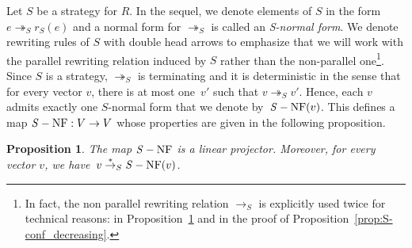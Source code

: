 \documentclass[10pt]{easychair}
\newtheorem{proposition}[theorem]{Proposition}
\theoremstyle{definition}
\newcommand\parS{\twoheadrightarrow_S}
\newcommand\transRew{\overset{*}{\to}}
\DeclareMathOperator{\SNF}{{\it S}-NF}
\begin{document}
Let $S$ be a strategy for $R$. In the sequel, we denote elements of $S$
in the form $e\parS r_S(e)$ and a normal form for $\parS$ is called an
{\em S-normal form}. We denote rewriting rules of $S$ with double head
arrows to emphasize that we will work with the parallel rewriting
relation induced by $S$ rather than the non-parallel one\footnote{In
  fact, the non parallel rewriting relation $\to_S$ is explicitly used
  twice for technical reasons: in Proposition~\ref{prop:linearity_of_SNF}
  and in the proof of Proposition~\ref{prop:S-conf_decreasing}.}. Since
$S$ is a strategy, $\parS$ is terminating and it is deterministic in the
sense that for every vector $v$, there is at most one~$v'$ such that
$v\parS v'$. Hence, each $v$ admits exactly one $S$-normal form that we
denote by~$\SNF(v)$. This defines a map $\SNF:V\to V$ whose properties
are given in the following proposition.
\smallskip

\begin{proposition}\label{prop:linearity_of_SNF}
  The map $\SNF$ is a linear projector. Moreover, for every vector $v$,
  we have~$v\transRew_S\SNF(v)$.
\end{proposition}
\end{document}
